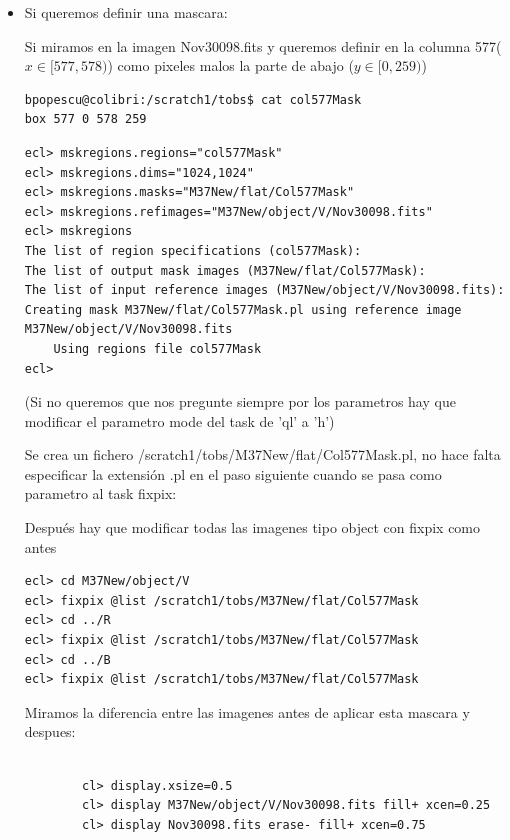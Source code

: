 \documentclass{article}
\begin{document}
\begin{itemize}
\begin{verbnobox}[\small]
\end{verbnobox}

\item Si queremos definir una mascara:

Si miramos en la imagen  Nov30098.fits y queremos definir en la columna 577($ x \in [577,578) $) como pixeles malos la parte de abajo ($ y \in [0, 259) $)
\begin{verbatim}
bpopescu@colibri:/scratch1/tobs$ cat col577Mask 
box 577 0 578 259
\end{verbatim}

\begin{verbatim}
ecl> mskregions.regions="col577Mask"
ecl> mskregions.dims="1024,1024"
ecl> mskregions.masks="M37New/flat/Col577Mask"
ecl> mskregions.refimages="M37New/object/V/Nov30098.fits"
ecl> mskregions
The list of region specifications (col577Mask): 
The list of output mask images (M37New/flat/Col577Mask): 
The list of input reference images (M37New/object/V/Nov30098.fits): 
Creating mask M37New/flat/Col577Mask.pl using reference image M37New/object/V/Nov30098.fits
    Using regions file col577Mask
ecl> 
\end{verbatim}
(Si no queremos que nos pregunte siempre por los parametros hay que modificar el parametro mode del task de 'ql' a 'h')

Se crea un fichero /scratch1/tobs/M37New/flat/Col577Mask.pl, no hace falta especificar la extensión .pl en el paso siguiente cuando se pasa como parametro al task fixpix:

Después hay que modificar todas las imagenes tipo object con fixpix como antes


\begin{verbatim}
ecl> cd M37New/object/V
ecl> fixpix @list /scratch1/tobs/M37New/flat/Col577Mask
ecl> cd ../R
ecl> fixpix @list /scratch1/tobs/M37New/flat/Col577Mask
ecl> cd ../B
ecl> fixpix @list /scratch1/tobs/M37New/flat/Col577Mask
\end{verbatim}

Miramos la diferencia entre las imagenes antes de aplicar esta mascara y despues:
			
\begin{verbatim}

        cl> display.xsize=0.5
        cl> display M37New/object/V/Nov30098.fits fill+ xcen=0.25
        cl> display Nov30098.fits erase- fill+ xcen=0.75


\end{verbatim}


\end{itemize}
\end{document}

